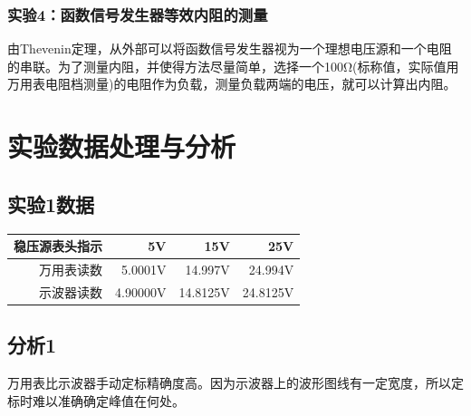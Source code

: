 \documentclass[a4paper,11pt,UTF8]{ctexart}
\begin{document}
	\subsubsection{实验4：函数信号发生器等效内阻的测量}
		由Thevenin定理，从外部可以将函数信号发生器视为一个理想电压源和一个电阻的串联。为了测量内阻，并使得方法尽量简单，选择一个100Ω(标称值，实际值用万用表电阻档测量)的电阻作为负载，测量负载两端的电压，就可以计算出内阻。
\section{实验数据处理与分析}
\subsection{实验1数据}
		\begin{center}
	\begin{tabular}{|r|r|r|r|}
	\hline
	稳压源表头指示 & 5V & 15V & 25V\\
	\hline
	万用表读数 & 5.0001V & 14.997V & 24.994V\\
	\hline
	示波器读数 & 4.90000V & 14.8125V & 24.8125V\\
	\hline
		\end{tabular}
		\end{center}
\subsection{分析1}
	万用表比示波器手动定标精确度高。因为示波器上的波形图线有一定宽度，所以定标时难以准确确定峰值在何处。
\end{document}
